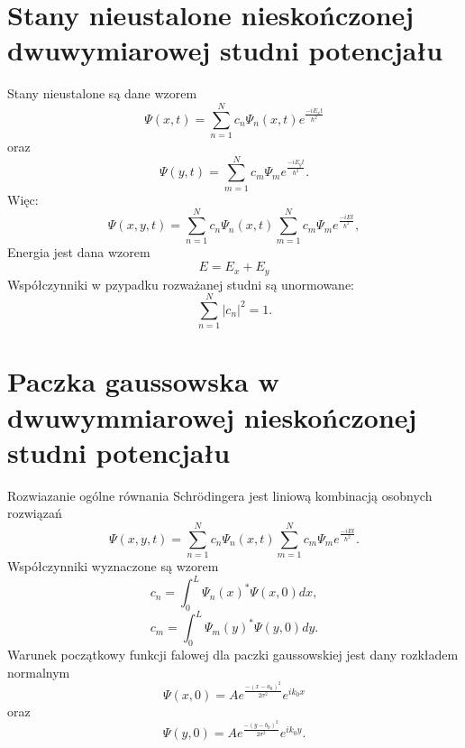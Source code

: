 \documentclass[11pt,a4paper,oneside]{article}
\begin{document}
\section{Stany nieustalone nieskończonej dwuwymiarowej studni potencjału}
	Stany nieustalone są dane wzorem
	\begin{equation}
		\Psi (x, t) = \sum_{n=1}^{N} c_{n}\Psi_{n}(x, t)e^{\frac{-iE_{x}t}{\hbar ^{2}}}
	\end{equation}
	oraz
	\begin{equation}
		\Psi (y, t) = \sum_{m=1}^{N} c_{m}\Psi_{m} e^{\frac{-iE_{y}t}{\hbar ^{2}}}.
	\end{equation}
	Więc:
	\begin{equation}
		\Psi(x, y, t) = \sum_{n=1}^{N} c_{n}\Psi_{n}(x, t)\sum_{m=1}^{N} c_{m}\Psi_{m} e^{\frac{-iEt}{\hbar ^{2}}},
	\end{equation}
	Energia jest dana wzorem
	\begin{equation}
		E = E_{x}+E_{y}
	\end{equation}
	Współczynniki w pzypadku rozważanej studni są unormowane:
	\begin{equation}
		\sum_{n=1}^{N}|c_{n}|^{2} = 1.
	\end{equation}
\section{Paczka gaussowska w dwuwymmiarowej nieskończonej studni potencjału}
	Rozwiazanie ogólne równania Schrödingera jest liniową kombinacją osobnych rozwiązań
	\begin{equation}
		\Psi(x, y, t) = \sum_{n=1}^{N} c_{n}\Psi_{n}(x, t)\sum_{m=1}^{N} c_{m}\Psi_{m} e^{\frac{-iEt}{\hbar ^{2}}}.
	\end{equation}
	Współczynniki wyznaczone są wzorem
	\begin{equation}
		c_{n} = \int_{0}^{L}\Psi _{n}(x)^{*}\Psi (x,0)dx,
	\end{equation}
	\begin{equation}
		c_{m} = \int_{0}^{L}\Psi _{m}(y)^{*}\Psi (y,0)dy.
	\end{equation}	
	Warunek początkowy funkcji falowej dla paczki gaussowskiej jest dany rozkładem normalnym
	\begin{equation}
		\Psi(x, 0) = Ae^{\frac{-(x-a_{0})^{2}}{2\sigma ^{2}}}e^{ik_{0}x}
	\end{equation}
	oraz
	\begin{equation}
		\Psi(y, 0) = Ae^{\frac{-(y-b_{0})^{2}}{2\sigma ^{2}}}e^{ik_{0}y}.
	\end{equation}	
\end{document}
